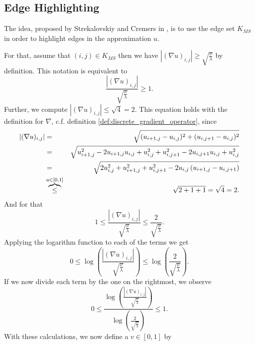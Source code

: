 \documentclass{scrreprt}
\begin{document}

        \subsection{Edge Highlighting} %
        \label{sub:edge_highlighting}
            
            The idea, proposed by Strekalovskiy and Cremers in \cite{Strekalovskiy-Cremers-eccv14}, is to use the edge set $K_{MS}$ in order to highlight edges in the approximation $u$.

            For that, assume that $(i,j) \in K_{MS}$ then we have $|(\nabla u)_{i,j}| \ge \sqrt{\frac{\nu}{\lambda}}$ by definition. This notation is equivalent to
                $$
                    \frac{|(\nabla u)_{i,j}|}{\sqrt{\frac{\nu}{\lambda}}} \ge 1.
                $$
            Further, we compute $|(\nabla u)_{i,j}| \le \sqrt{4} = 2$. This equation holds with the definition for $\nabla$, c.f. definition \ref{def:discrete_gradient_operator}, since
                \begin{eqnarray}
                    |(\nabla u)_{i,j}| &=& \sqrt{(u_{i+1,j} - u_{i,j})^{2} + (u_{i,j+1} - u_{i,j})^{2}} \notag \\
                    &=& \sqrt{u_{i+1,j}^{2} - 2u_{i+1,j}u_{i,j} + u_{i,j}^{2} + u_{i,j+1}^{2} - 2u_{i,j+1}u_{i,j} + u_{i,j}^{2}} \notag \\
                    &=& \sqrt{2u_{i,j}^{2} + u_{i+1,j}^{2} + u_{i,j+1}^{2} - 2u_{i,j}\left(u_{i+1,j} - u_{i,j+1}\right)} \notag \\
                    &\overbrace{\le}^{u \in [0,1]}& \sqrt{2 + 1 + 1} = \sqrt{4} = 2.
                \end{eqnarray}
            And for that
                $$
                    1 \le \frac{|(\nabla u)_{i,j}|}{\sqrt{\frac{\nu}{\lambda}}} \le \frac{2}{\sqrt{\frac{\nu}{\lambda}}}.
                $$
            Applying the logarithm function to each of the terms we get
                $$
                    0 \le \log \left( \frac{|(\nabla u)_{i,j}|}{\sqrt{\frac{\nu}{\lambda}}} \right) \le \log \left( \frac{2}{\sqrt{\frac{\nu}{\lambda}}} \right).
                $$
            If we now divide each term by the one on the rightmost, we observe
                $$
                    0 \le \frac{\log \left( \frac{|(\nabla u)_{i,j}|}{\sqrt{\frac{\nu}{\lambda}}} \right)}{\log \left( \frac{2}{\sqrt{\frac{\nu}{\lambda}}} \right)} \le 1.
                $$
            With these calculations, we now define a $v \in [0, 1]$ by
\end{document}
